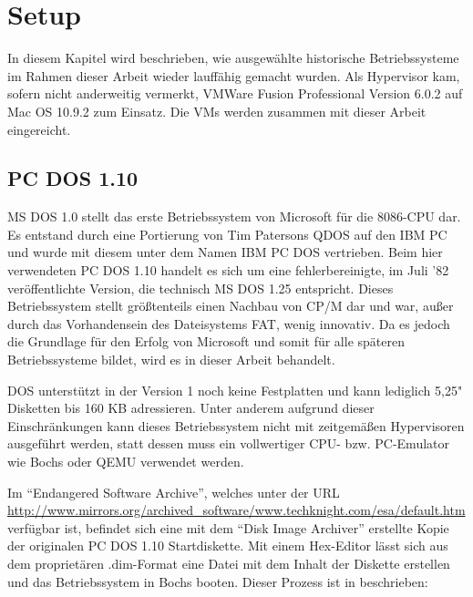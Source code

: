 \chapter{Setup}
\label{chap:setup}

	In diesem Kapitel wird beschrieben, wie ausgewählte historische Betriebssysteme im Rahmen dieser Arbeit wieder lauffähig gemacht wurden. Als Hypervisor kam, sofern nicht anderweitig vermerkt, VMWare Fusion Professional Version 6.0.2 auf Mac OS 10.9.2 zum Einsatz. 
	Die VMs werden zusammen mit dieser Arbeit eingereicht.

\section{PC DOS 1.10}

	MS DOS 1.0 stellt das erste Betriebssystem von Microsoft für die 8086-CPU dar. Es entstand durch eine Portierung von Tim Patersons QDOS auf den IBM PC und wurde mit diesem unter dem Namen IBM PC DOS vertrieben. \cite{WinHistory}
	Beim hier verwendeten PC DOS 1.10 handelt es sich um eine fehlerbereinigte, im Juli '82 veröffentlichte Version, die technisch MS DOS 1.25 entspricht. 
	Dieses Betriebssystem stellt größtenteils einen Nachbau von CP/M dar und war, außer durch das Vorhandensein des Dateisystems \gls{FAT}, wenig innovativ.
	Da es jedoch die Grundlage für den Erfolg von Microsoft und somit für alle späteren Betriebssysteme bildet, wird es in dieser Arbeit behandelt.

	DOS unterstützt in der Version 1 noch keine Festplatten und kann lediglich 5,25" Disketten bis 160 KB adressieren. \cite{WinHistory}
	Unter anderem aufgrund dieser Einschränkungen kann dieses Betriebssystem nicht mit zeitgemäßen Hypervisoren ausgeführt werden, statt dessen muss ein vollwertiger CPU- bzw. PC-Emulator wie Bochs oder QEMU verwendet werden. 

	Im "`Endangered Software Archive"', welches unter der URL \url{http://www.mirrors.org/archived_software/www.techknight.com/esa/default.htm} verfügbar ist, befindet sich eine mit dem "`Disk Image Archiver"' erstellte Kopie der originalen PC DOS 1.10 Startdiskette. 
	Mit einem Hex-Editor lässt sich aus dem proprietären .dim-Format eine Datei mit dem Inhalt der Diskette erstellen und das Betriebssystem in Bochs booten.
	Dieser Prozess ist in \cite{PCMinistry} beschrieben:

